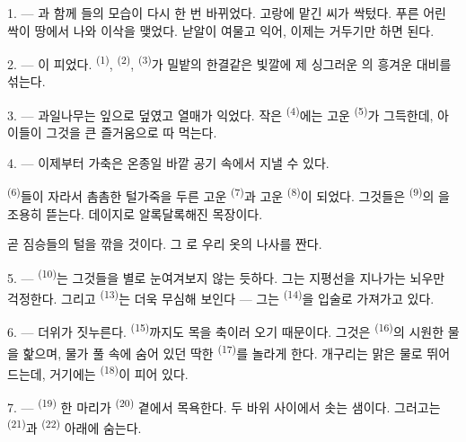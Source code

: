 \VUsaut{5.0mm}
\VUsaut{3.0mm}
\VUsaut{3.0mm}
\VUsaut{4.0mm}
\VUsaut{3.0mm}

1. --- 과 함께 들의 모습이 다시 한 번 바뀌었다. 고랑에 맡긴 씨가 싹텄다.
푸른 어린 싹이 땅에서 나와 이삭을 맺었다. 낟알이 여물고 익어, 이제는 거두기만 하면 된다.

2. --- 이 피었다.  \textsuperscript{(1)},
 \textsuperscript{(2)},  \textsuperscript{(3)}가 밀밭의
한결같은 빛깔에 제 싱그러운 의 흥겨운 대비를 섞는다.

3. --- 과일나무는 잎으로 덮였고 열매가 익었다. 작은 
\textsuperscript{(4)}에는 고운  \textsuperscript{(5)}가 그득한데, 아이들이 그것을
큰 즐거움으로 따 먹는다.

4. --- 이제부터 가축은 온종일 바깥 공기 속에서 지낼 수 있다.

 \textsuperscript{(6)}들이 자라서 촘촘한 털가죽을 두른 고운 
\textsuperscript{(7)}과 고운  \textsuperscript{(8)}이 되었다. 그것들은
 \textsuperscript{(9)}의 을 조용히 뜯는다. 데이지로 알록달록해진
목장이다.

곧  짐승들의 털을 깎을 것이다. 그 로 우리 옷의 나사를 짠다.

\VUsaut{5.0mm}
\VUsaut{3.4mm}

5. ---  \textsuperscript{(10)}는 그것들을 별로 눈여겨보지 않는 듯하다. 그는
지평선을 지나가는 뇌우만 걱정한다. 그리고  \textsuperscript{(13)}는
더욱 무심해 보인다 — 그는  \textsuperscript{(14)}을 입술로 가져가고 있다.

6. --- 더위가 짓누른다.  \textsuperscript{(15)}까지도 목을 축이러 오기 때문이다.
그것은  \textsuperscript{(16)}의 시원한 물을 핥으며, 물가 풀 속에 숨어 있던
딱한  \textsuperscript{(17)}를 놀라게 한다. 개구리는 맑은 물로 뛰어드는데,
거기에는  \textsuperscript{(18)}이 피어 있다.

7. ---  \textsuperscript{(19)} 한 마리가  \textsuperscript{(20)} 곁에서
목욕한다. 두 바위 사이에서 솟는 샘이다. 그러고는  \textsuperscript{(21)}과
 \textsuperscript{(22)} 아래에 숨는다.

